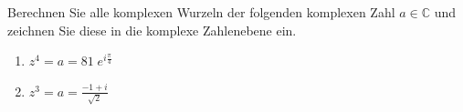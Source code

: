 \begin{ExerciseBlock}
Berechnen Sie alle komplexen Wurzeln der folgenden komplexen Zahl $a \in \mathbb{C}$ und zeichnen Sie diese in die komplexe Zahlenebene ein.

\begin{enumerate}[label=\alph*)]
	\item $z^4 = a = 81 \; e^{i \frac{\pi}{4}}$
	\item $z^3 = a = \frac{-1 + i}{\sqrt{2}}$
\end{enumerate}

\end{ExerciseBlock}
